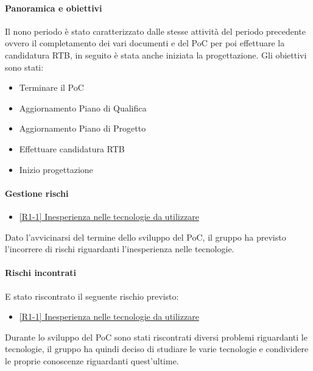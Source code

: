 \documentclass[a4paper,12pt]{article}
\begin{document}
            \paragraph{Panoramica e obiettivi}
            Il nono periodo è stato caratterizzato dalle stesse attività del periodo precedente ovvero il completamento dei vari documenti e del PoC per poi effettuare la candidatura RTB, in seguito è stata anche iniziata la progettazione. Gli obiettivi sono stati:
            \begin{itemize}
                \item Terminare il PoC
                \item Aggiornamento Piano di Qualifica
                \item Aggiornamento Piano di Progetto
                \item Effettuare candidatura RTB
                \item Inizio progettazione
            \end{itemize}
            
            \paragraph{Gestione rischi}
                \begin{itemize}
                \item\hyperref[tab:r1]{[R1-1] Inesperienza nelle tecnologie da utilizzare}
                \end{itemize}
                Dato l'avvicinarsi del termine dello sviluppo del PoC, il gruppo ha previsto l'incorrere di rischi riguardanti l'inesperienza nelle tecnologie.
    
                \paragraph*{Rischi incontrati}
                E stato riscontrato il seguente rischio previsto:
                \begin{itemize}
                    \item \hyperref[tab:r1]{[R1-1] Inesperienza nelle tecnologie da utilizzare}
                \end{itemize}
                Durante lo sviluppo del PoC sono stati riscontrati diversi problemi riguardanti le tecnologie, il gruppo ha quindi deciso di studiare le varie tecnologie e condividere le proprie conoscenze riguardanti quest'ultime.
                
\end{document}
